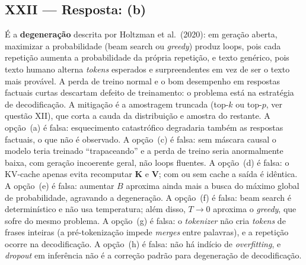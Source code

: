 \documentclass{dlproblemset}
\begin{document}
\subsection*{XXII — Resposta: (b)}
É a \textbf{degeneração} descrita por Holtzman et al.\ (2020): em geração aberta,
maximizar a probabilidade (beam search ou \textit{greedy}) produz loops, pois cada
repetição aumenta a probabilidade da própria repetição, e texto genérico, pois texto
humano alterna \textit{tokens} esperados e surpreendentes em vez de ser o texto mais
provável. A perda de treino normal e o bom desempenho em respostas factuais curtas
descartam defeito de treinamento: o problema está na estratégia de decodificação. A
mitigação é a amostragem truncada (top-$k$ ou top-$p$, ver questão XII), que corta a
cauda da distribuição e amostra do restante.
A opção~(a) é falsa: esquecimento catastrófico degradaria também as respostas factuais,
o que não é observado.
A opção~(c) é falsa: sem máscara causal o modelo teria treinado ``trapaceando'' e a
perda de treino seria anormalmente baixa, com geração incoerente geral, não loops
fluentes.
A opção~(d) é falsa: o KV-cache apenas evita recomputar $\mathbf{K}$ e $\mathbf{V}$;
com ou sem cache a saída é idêntica.
A opção~(e) é falsa: aumentar $B$ aproxima ainda mais a busca do máximo global de
probabilidade, agravando a degeneração.
A opção~(f) é falsa: beam search é determinístico e não usa temperatura; além disso,
$T \to 0$ aproxima o \textit{greedy}, que sofre do mesmo problema.
A opção~(g) é falsa: o \textit{tokenizer} não cria \textit{tokens} de frases inteiras (a
pré-tokenização impede \textit{merges} entre palavras), e a repetição ocorre na
decodificação.
A opção~(h) é falsa: não há indício de \textit{overfitting}, e \textit{dropout} em
inferência não é a correção padrão para degeneração de decodificação.

\end{document}
